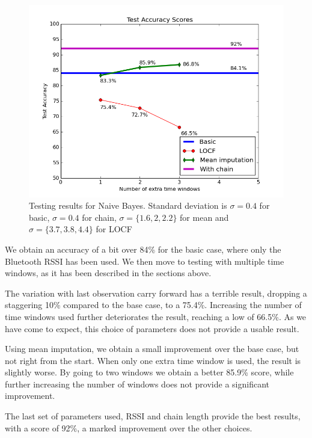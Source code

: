 \begin{figure}[h]
	\begin{center}
		\includegraphics[scale=0.7]{figures/naive_tot.png}
	\end{center}
	
	\caption{Testing results for Naive Bayes. Standard deviation is $\sigma= 0.4 $ for basic, $\sigma= 0.4 $ for chain, $\sigma=\lbrace 1.6, 2, 2.2 \rbrace $ for mean and  $\sigma=\lbrace 3.7, 3.8, 4.4 \rbrace$ for LOCF}
	\label{pic:naive_tot}

\end{figure}

We obtain an accuracy of a bit over 84\% for the basic case, where only the Bluetooth RSSI has been used. We then move to testing with multiple time windows, as it has been described in the sections above.

The variation with last observation carry forward has a terrible result, dropping a staggering 10\% compared to the base case, to a 75.4\%. Increasing the number of time windows used further deteriorates the result, reaching a low of 66.5\%. As we have come to expect, this choice of parameters does not provide a usable result.

Using mean imputation, we obtain a small improvement over the base case, but not right from the start. When only one extra time window is used, the result is slightly worse. By going to two windows we obtain a better 85.9\% score, while further increasing the number of windows does not provide a significant improvement. 

The last set of parameters used, RSSI and chain length provide the best results, with a score of 92\%, a marked improvement over the other choices.  

